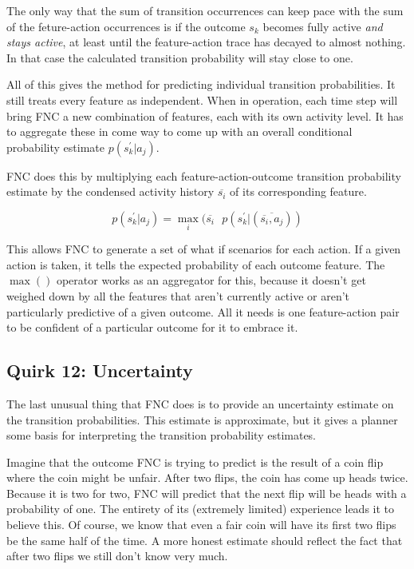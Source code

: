 The only way that the sum of transition occurrences can keep pace with the
sum of the feture-action occurrences is if the outcome $s_k$ becomes fully active
\textit{and stays active}, at least until the feature-action trace has decayed
to almost nothing. In that case the calculated transition probability will
stay close to one.

All of this gives the method for predicting individual transition probabilities.
It still treats every feature as independent. When in operation, each time step
will bring FNC a new combination of features, each with its own activity level.
It has to aggregate these in come way to come up with an overall conditional
probability estimate $p(s^\prime_k | a_j)$.

FNC does this by multiplying each feature-action-outcome transition probability
estimate by the condensed activity history $\overline{s_i}$ of its
corresponding feature.

\begin{equation}
p(s^\prime_k | a_j) = \max_i (\overline{s_i} \mbox{ }
p(s^\prime_k | (\overline{\overline{s_i}, a_j}))
\end{equation}

This allows FNC to generate a set of what if scenarios for each action.
If a given action is taken, it tells the expected probability of each
outcome feature. The $\max()$ operator works as an aggregator for this, because
it doesn't get weighed down by all the features that aren't currently active
or aren't particularly predictive of a given outcome. All it needs is one
feature-action pair to be confident of a particular outcome for it to embrace it.

\subsection*{Quirk 12: Uncertainty}
\label{algouncertainty}
The last unusual thing that FNC does is to provide an uncertainty estimate
on the transition probabilities. This estimate is approximate, but it
gives a planner some basis for interpreting the transition probability estimates.

Imagine that the outcome FNC is trying to predict is the result of a coin
flip where the coin might be unfair. After two flips, the coin has come up
heads twice. Because it is two for two, FNC will predict that the next flip will
be heads with a probability of one. The entirety of its (extremely limited)
experience leads it to believe this. Of course, we know that even a fair coin
will have its first two flips be the same half of the time. A more honest
estimate should reflect the fact that after two flips we still don’t know
very much.

